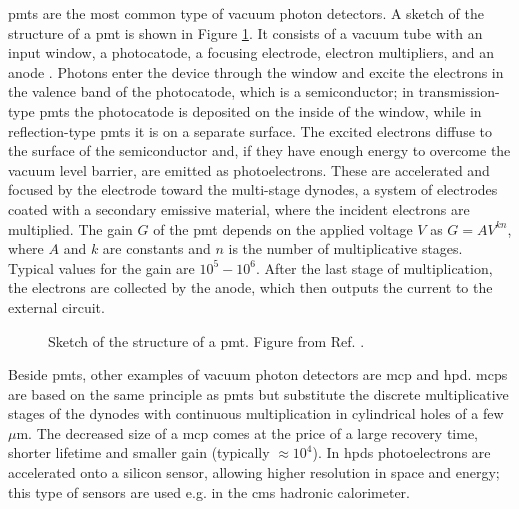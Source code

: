 \Glspl{pmt} are the most common type of vacuum photon detectors. 
A sketch of the structure of a \gls{pmt} is shown in Figure \ref{fig:det:pmt}. It consists of a vacuum tube with an input window, a photocatode, 
a focusing electrode, electron multipliers, and an anode  \cite{hamamatsu}. 
Photons enter the device through the window and excite the electrons in the valence band of the photocatode, which is a semiconductor; 
in transmission-type \glspl{pmt} the photocatode is deposited on the inside of the window, 
while in reflection-type \glspl{pmt} it is on a separate surface. 
The excited electrons diffuse to the surface of the semiconductor and, if they have enough energy to overcome the vacuum level barrier, 
are emitted as photoelectrons. These are accelerated and focused by the electrode toward the multi-stage dynodes, 
a system of electrodes coated with a secondary emissive material, 
where the incident electrons are multiplied. 
The gain $G$ of the \gls{pmt} depends on the applied voltage $V$ as $G=AV^{kn}$, 
where $A$ and $k$ are constants and $n$ is the number of multiplicative stages. 
Typical values for the gain are $10^5-10^6$. After the last stage of multiplication, the electrons are collected by the anode, 
which then outputs the current to the external circuit.

\begin{figure}[ht]
\centering
{}
\caption{Sketch of the structure of a \gls{pmt}. Figure from Ref. \cite{hamamatsu}.}
\label{fig:det:pmt}
\end{figure}

Beside \glspl{pmt}, other examples of vacuum photon detectors are \gls{mcp} and \gls{hpd}. \glspl{mcp} are based on the same principle as \glspl{pmt} but substitute the discrete multiplicative stages of the dynodes with continuous multiplication in cylindrical holes of a few $\mu$m. The decreased size of a \gls{mcp} comes at the price of a large recovery time, shorter lifetime and smaller gain (typically $\approx 10^4$). In \glspl{hpd} photoelectrons are accelerated onto a silicon sensor, allowing higher resolution in space and energy; this type of sensors are used e.g. in the \gls{cms} hadronic calorimeter.

